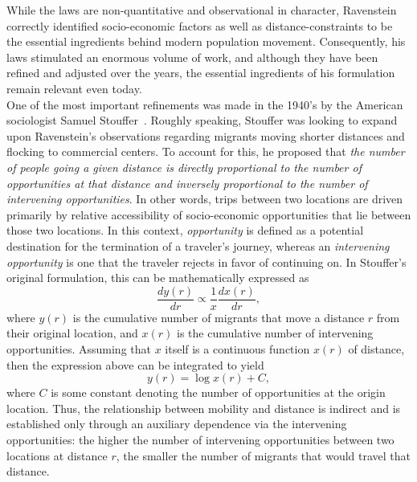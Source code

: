 While the laws are non-quantitative and observational in character, Ravenstein correctly identified socio-economic factors as well as distance-constraints to be the essential ingredients behind modern population movement. Consequently, his laws stimulated an enormous volume of work, and although they have been refined and adjusted over the years, the essential ingredients of his formulation remain relevant even today.\\

 One of the most important refinements was made in the 1940's by the American sociologist Samuel Stouffer~\cite{stouffer_1940_intervening}. Roughly speaking, Stouffer was looking to expand upon Ravenstein's observations regarding migrants moving shorter distances and flocking to commercial centers. To account for this, he proposed that \emph{the number of people going a given distance is directly proportional to the number of opportunities at that distance and inversely proportional to the number of intervening opportunities}. In other words, trips between two locations are driven primarily by relative accessibility of socio-economic opportunities that lie between those two locations. In this context, \emph{opportunity} is defined as a potential destination for the termination of a traveler's journey, whereas an \emph{intervening opportunity} is one that the traveler rejects in favor of continuing on. In Stouffer's original formulation, this can be mathematically expressed as
\begin{equation}
\frac{d y(r)}{dr} \propto \frac{1}{x}\frac{d x(r)}{dr},
\label{io_eq1}
\end{equation}
where $y(r)$ is the cumulative number of migrants that move a distance $r$ from their original location, and $x(r)$ is the cumulative number of intervening opportunities. 
Assuming that $x$ itself is a continuous function $x(r)$ of distance, then the expression above can be integrated to yield
\begin{equation}
y(r) = \log x(r) + C,
\label{io_eq2}
 \end{equation}
where $C$ is some constant denoting the number of opportunities at the origin location. Thus, the relationship between mobility and distance is indirect and is established only through an auxiliary dependence via the intervening opportunities: the higher the number of intervening opportunities between two locations at distance $r$, the smaller the number of migrants that would travel that distance.
